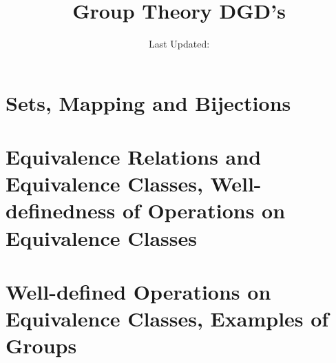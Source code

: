\documentclass[openany]{report}
\title{Group Theory DGD's}
\author{Last Updated:}
\begin{document}
\maketitle

\tableofcontents

\chapter{Sets, Mapping and Bijections}
\chapter{Equivalence Relations and Equivalence Classes, Well-definedness of Operations on Equivalence Classes}
\chapter{Well-defined Operations on Equivalence Classes, Examples of Groups}
\end{document}
